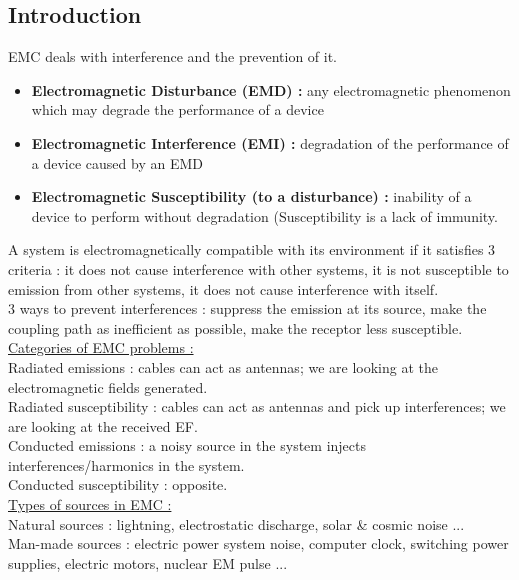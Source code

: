 \documentclass[../main.tex]{subfiles}
\begin{document}
\localtableofcontents

\subsection{Introduction}
EMC deals with interference and the prevention of it.\\
\begin{itemize}
    \item \textbf{Electromagnetic Disturbance (EMD) :} any electromagnetic phenomenon which may degrade the performance of a device
    \item \textbf{Electromagnetic Interference (EMI) :} degradation of the performance of a device caused by an EMD
    \item \textbf{Electromagnetic Susceptibility (to a disturbance) :} inability of a device to perform without degradation (Susceptibility is a lack of immunity.
\end{itemize}

A system is electromagnetically compatible with its environment if it satisfies 3 criteria : it does not cause interference with other systems, it is not susceptible to emission from other systems, it does not cause interference with itself.\\

3 ways to prevent interferences : suppress the emission at its source, make the coupling path as inefficient as possible, make the receptor less susceptible.\\

\quad \underline{Categories of EMC problems :}\\
Radiated emissions : cables can act as antennas; we are looking at the electromagnetic fields generated.\\
Radiated susceptibility : cables can act as antennas and pick up interferences; we are looking at the received EF.\\
Conducted emissions : a noisy source in the system injects interferences/harmonics in the system.\\
Conducted susceptibility : opposite.\\

\quad \underline{Types of sources in EMC :}\\
Natural sources : lightning, electrostatic discharge, solar \& cosmic noise ...\\
Man-made sources : electric power system noise, computer clock, switching power supplies, electric motors, nuclear EM pulse ...\\
\end{document}
